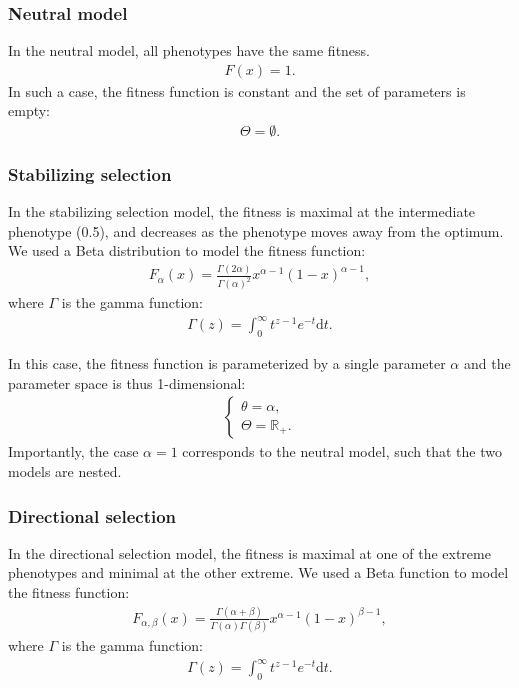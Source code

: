 \documentclass{article}
\newcommand{\der}{\text{d}}
\newcommand{\PhenoDef}{x}
\newcommand{\FitParam}{\theta}
\newcommand{\FitParamSet}{\Theta}
\newcommand{\PhenoFitMapDef}{F}
\begin{document}
    \subsubsection{Neutral model}
    In the neutral model, all phenotypes have the same fitness.
    \begin{align}
        \PhenoFitMapDef (\PhenoDef) = 1.
    \end{align}
    In such a case, the fitness function is constant and the set of parameters is empty:
    \begin{gather}
        \FitParamSet = \emptyset.
    \end{gather}

    \subsubsection{Stabilizing selection}
    In the stabilizing selection model, the fitness is maximal at the intermediate phenotype (0.5), and decreases as the phenotype moves away from the optimum.
    We used a Beta distribution to model the fitness function:
    \begin{align}
        \PhenoFitMapDef_{\alpha} (\PhenoDef) = \frac {\Gamma (2 \alpha )}{\Gamma (\alpha )^2} \PhenoDef^{\alpha -1}(1-\PhenoDef)^{\alpha -1},
    \end{align}
    where $\Gamma$ is the gamma function:
    \begin{align}
        \Gamma (z)=\int _{0}^{\infty }t^{z-1}e^{-t} \der t.
    \end{align}

    In this case, the fitness function is parameterized by a single parameter $\alpha$ and the parameter space is thus 1-dimensional:
    \begin{gather}
        \begin{cases}
            \FitParam = \alpha,\\
            \FitParamSet = \mathbb{R}_{+}.
        \end{cases}
    \end{gather}
    Importantly, the case $\alpha = 1$ corresponds to the neutral model, such that the two models are nested.

    \subsubsection{Directional selection}
    In the directional selection model, the fitness is maximal at one of the extreme phenotypes and minimal at the other extreme.
    We used a Beta function to model the fitness function:
    \begin{align}
        \PhenoFitMapDef_{\alpha, \beta} (\PhenoDef) = \frac {\Gamma (\alpha +\beta )}{\Gamma (\alpha )\Gamma (\beta )} \PhenoDef^{\alpha -1}(1-\PhenoDef)^{\beta -1},
    \end{align}
    where $\Gamma$ is the gamma function:
    \begin{align}
        \Gamma (z)=\int _{0}^{\infty }t^{z-1}e^{-t} \der t.
    \end{align}
\end{document}

